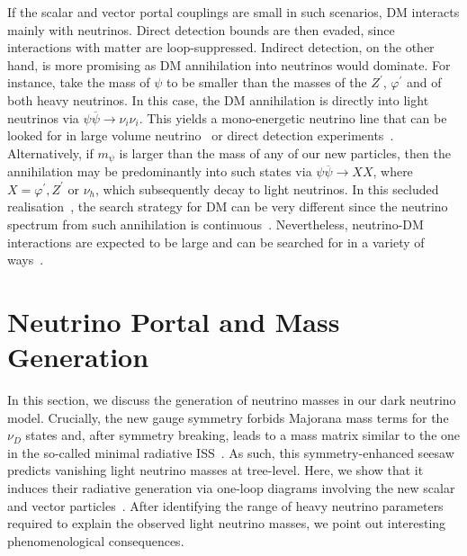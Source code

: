 If the scalar and vector portal couplings are small in such scenarios, DM interacts mainly with neutrinos. Direct detection bounds are then evaded, since interactions with matter are loop-suppressed. Indirect detection, on the other hand, is more promising as DM annihilation into neutrinos would dominate. For instance, take the mass of $\psi$ to be smaller than the masses of the $Z^\prime$, $\varphi^\prime$ and of both heavy neutrinos. In this case, the DM annihilation is directly into light neutrinos via $\psi \overline{\psi} \to \nu_i \nu_i$. This yields a mono-energetic neutrino line that can be looked for in large volume neutrino~\cite{Beacom:2006tt,PalomaresRuiz:2007eu} or direct detection experiments~\cite{McKeen:2018pbb}. Alternatively, if $m_\psi$ is larger than the mass of any of our new particles, then the annihilation may be predominantly into such states via $\psi \overline{\psi} \to X X$, where $X=\varphi^\prime, Z^\prime$ or $\nu_h$, which subsequently decay to light neutrinos. In this secluded realisation~\cite{Pospelov:2007mp}, the search strategy for DM can be very different since the neutrino spectrum from such annihilation is continuous~\cite{Escudero:2016ksa}. Nevertheless, neutrino-DM interactions are expected to be large and can be searched for in a variety of ways~\cite{Mangano:2006mp,Wilkinson:2014ksa,Farzan:2014gza,Campo:2017nwh,Arguelles:2017atb}.




\section{Neutrino Portal and Mass Generation}  

In this section, we discuss the generation of neutrino masses in our dark neutrino model. Crucially, the new gauge symmetry forbids Majorana mass terms for the $\nu_D$ states and, after symmetry breaking, leads to a mass matrix similar to the one in the so-called minimal radiative ISS~\cite{Dev:2012sg}. As such, this symmetry-enhanced seesaw predicts vanishing light neutrino masses at tree-level. Here, we show that it induces their radiative generation via one-loop diagrams involving the new scalar and vector particles~\cite{Dev:2012sg,Zhang:2013ama,Diaz:2017edh}. After identifying the range of heavy neutrino parameters required to explain the observed light neutrino masses, we point out interesting phenomenological consequences.

